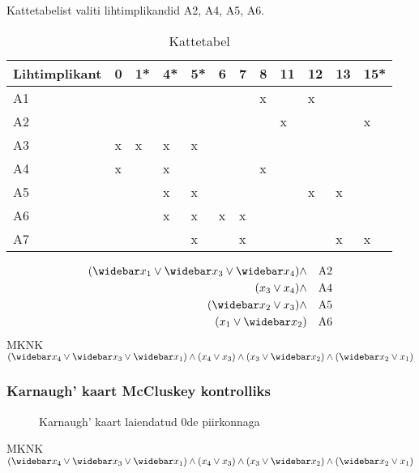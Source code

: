 Kattetabelist valiti lihtimplikandid A2, A4, A5, A6.
\begin{table}[H]
\centering
\caption{Kattetabel}
\label{kattetabel}
\begin{tabular}{|l|l|l|l|l|l|l|l|l|l|l|l|}
\hline
Lihtimplikant & 0 & 1* & 4* & 5* & 6 & 7 & 8 & 11 & 12 & 13 & 15* \\ \hline
A1            &   &    &    &    &   &   & x &    & x  &    &     \\ \hline
\rowcolor{Goldenrod!30}
A2            &   &    &    &    &   &   &   & x  &    &    & x   \\ \hline
A3            & x & x  & x  & x  &   &   &   &    &    &    &     \\ \hline
\rowcolor{Goldenrod!30}
A4            & x &    & x  &    &   &   & x &    &    &    &     \\ \hline
\rowcolor{Goldenrod!30}
A5            &   &    & x  & x  &   &   &   &    & x  & x  &     \\ \hline
\rowcolor{Goldenrod!30}
A6            &   &    & x  & x  & x & x &   &    &    &    &     \\ \hline
A7            &   &    &    & x  &   & x &   &    &    & x  & x   \\ \hline
\end{tabular}
\end{table}
\begin{align*} 
(\wb{x_1}\lor\wb{x_3}\lor\wb{x_4})\land &&\mbox{A2}\\
(x_3\lor x_4)\land &&\mbox{A4}\\
(\wb{x_2} \lor x_3)\land &&\mbox{A5}\\
(x_1\lor \wb{x_2}) &&\mbox{A6}
\end{align*}
MKNK $(\wb{x_4} \lor \wb{x_3} \lor \wb{x_1}) \land (x_4 \lor x_3) \land (x_3 \lor \wb{x_2}) \land (\wb{x_2} \lor x_1)$

\subsubsection{Karnaugh' kaart McCluskey kontrolliks}
\begin{figure}[H]
\centering
\begin{Karnaugh}
\end{Karnaugh}
\caption{Karnaugh' kaart laiendatud 0de piirkonnaga}
\label{fig:karnaugh-piirkond0}
\end{figure}
MKNK $(\wb{x_4} \lor \wb{x_3} \lor \wb{x_1}) \land (x_4 \lor x_3) \land (x_3 \lor \wb{x_2}) \land (\wb{x_2} \lor x_1)$
